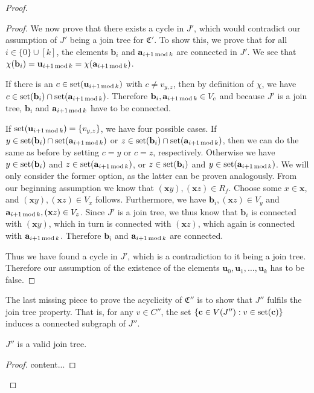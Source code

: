 \begin{proof}
\begin{proof}
		We now prove that there exists a cycle in $J'$, which would contradict our assumption of $J'$ being a join tree for $\mathfrak C'$.
		To show this, we prove that for all $i\in\{0\}\cup[k]$, the elements $\mathbf b_i$ and $\mathbf a_{i+1\operatorname{mod} k}$ are connected in $J'$.
		We see that $\chi(\mathbf b_i)=\mathbf u_{i+1\operatorname{mod} k} = \chi(\mathbf a_{i+1\operatorname{mod} k})$.
		
		If there is an $c\in \operatorname{set}(\mathbf u_{i+1\operatorname{mod} k})$ with $c\neq v_{y,z}$, then by definition of $\chi$, we have $c\in \operatorname{set}(\mathbf b_i)\cap \operatorname{set}(\mathbf a_{i+1\operatorname{mod} k})$.
		Therefore $\mathbf b_i,\mathbf a_{i+1\operatorname{mod} k}\in V_c$ and because $J'$ is a join tree, $\mathbf b_i$ and $\mathbf a_{i+1\operatorname{mod} k}$ have to be connected.
		
		If $\operatorname{set}(\mathbf u_{i+1\operatorname{mod} k})=\{v_{y,z}\}$, we have four possible cases.
		If $y\in \operatorname{set}(\mathbf b_i)\cap \operatorname{set}(\mathbf a_{i+1\operatorname{mod} k})$ or $z\in \operatorname{set}(\mathbf b_i)\cap \operatorname{set}(\mathbf a_{i+1\operatorname{mod} k})$, then we can do the same as before by setting $c=y$ or $c=z$, respectively.
		Otherwise we have $y\in\operatorname{set}(\mathbf b_i)$ and $z\in \operatorname{set}(\mathbf a_{i+1\operatorname{mod} k})$, or $z\in\operatorname{set}(\mathbf b_i)$ and $y\in \operatorname{set}(\mathbf a_{i+1\operatorname{mod} k})$.
		We will only consider the former option, as the latter can be proven analogously.
		From our beginning assumption we know that $(\mathbf xy),(\mathbf xz)\in R_f$. Choose some $x\in\mathbf x$, and $(\mathbf xy),(\mathbf xz)\in V_x$ follows.
		Furthermore, we have $\mathbf b_i,(\mathbf xz)\in V_y$ and $\mathbf a_{i+1\operatorname{mod} k},(\mathbf xz)\in V_z$.
		Since $J'$ is a join tree, we thus know that $\mathbf b_i$ is connected with $(\mathbf xy)$, which in turn is connected with $(\mathbf xz)$, which again is connected with $\mathbf a_{i+1\operatorname{mod} k}$.
		Therefore $\mathbf b_i$ and $\mathbf a_{i+1\operatorname{mod} k}$ are connected.
		
		Thus we have found a cycle in $J'$, which is a contradiction to it being a join tree.
		Therefore our assumption of the existence of the elements $\mathbf u_0,\mathbf u_1,\dots,\mathbf u_k$ has to be false.
	\end{proof}
	
	The last missing piece to prove the acyclicity of $\mathfrak C''$ is to show that $J''$ fulfils the join tree property.
	That is, for any $v\in C''$, the set $\{\mathbf c\in V(J'') : v\in\operatorname{set}(\mathbf c)\}$ induces a connected subgraph of $J''$.
	
	\begin{claim}
		$J''$ is a valid join tree.
	\end{claim}
	\begin{proof}
		content...
	\end{proof}
\end{proof}
